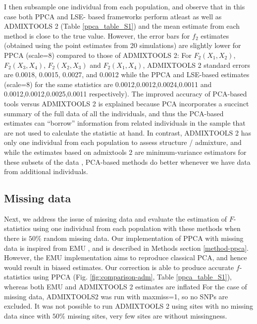 \documentclass[12pt]{article}
\begin{document}
I then subsample one individual from each population, and observe that in this case both PPCA and LSE- based frameworks perform atleast as well as ADMIXTOOLS 2 (Table \ref{ppca_table_S1}) and the mean estimate from each method is close to the true value. However, the error bars for $f_2$ estimates (obtained using the point estimates from 20 simulations) are slightly lower for PPCA (scale=8) compared to those of ADMIXTOOLS 2: For $F_2(X_1,X_2)$, $F_2(X_3,X_4)$, $F_2(X_2,X_3)$ and $F_2(X_1,X_4)$, ADMIXTOOLS 2 standard errors are 0.0018, 0.0015, 0.0027, and 0.0012 while the PPCA and LSE-based estimates (scale=8) for the same statistics are 0.0012,0.0012,0.0024,0.0011 and 0.0012,0.0012,0.0025,0.0011 respectively). The improved accuracy of PCA-based tools versus ADMIXTOOLS 2 is explained because PCA incorporates a succinct summary of the full data of all the individuals, and thus the PCA-based estimates can ``borrow'' information from related individuals in the sample that are not used to calculate the statistic at hand. In contrast, ADMIXTOOLS 2 has only one individual from each population to assess structure / admixture, and while the estimates based on admixtools 2 are minimum-variance estimators for these subsets of the data \citep{patterson_ancient_2012}, PCA-based methods do better whenever we have data from additional individuals.



\subsection{Missing data}
Next, we address the issue of missing data and evaluate the estimation of $F$-statistics using one individual from each population with these methods when there is $50\%$ random missing data. Our implementation of PPCA with missing data is inspired from EMU \citep{meisner_large-scale_2021}, and is described in Methods section \ref{method-ppca}. However, the EMU implementation aims to reproduce classical PCA, and hence would result in biased estimates. Our correction is able to produce accurate $f$-statistics using PPCA (Fig. \ref{fig:comparison-adm}, Table \ref{ppca_table_S1}), whereas both EMU and  ADMIXTOOLS 2 estimates are inflated For the case of missing data, ADMIXTOOLS2 was run with maxmiss=1, so no SNPs are excluded. It was not possible to run ADMIXTOOLS 2 using sites with no missing data since with $50\%$ missing sites, very few sites are without missingness. 
\end{document}
